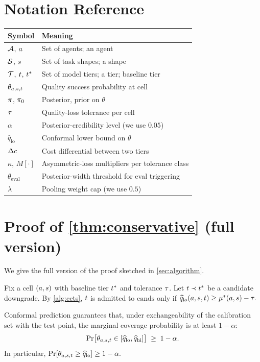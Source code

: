 \section{Notation Reference}
\label{app:notation}

\begin{center}
\begin{tabular}{ll}
\toprule
Symbol & Meaning \\
\midrule
$\mathcal{A}$, $a$ & Set of agents; an agent \\
$\mathcal{S}$, $s$ & Set of task shapes; a shape \\
$\mathcal{T}$, $t$, $t^*$ & Set of model tiers; a tier; baseline tier \\
$\theta_{a,s,t}$ & Quality success probability at cell \\
$\pi$, $\pi_0$ & Posterior, prior on $\theta$ \\
$\tau$ & Quality-loss tolerance per cell \\
$\alpha$ & Posterior-credibility level (we use $0.05$) \\
$\widehat{q}_{\mathrm{lo}}$ & Conformal lower bound on $\theta$ \\
$\Delta c$ & Cost differential between two tiers \\
$\kappa$, $M[\cdot]$ & Asymmetric-loss multipliers per tolerance class \\
$\theta_{\mathrm{eval}}$ & Posterior-width threshold for eval triggering \\
$\lambda$ & Pooling weight cap (we use $0.5$) \\
\bottomrule
\end{tabular}
\end{center}

\section{Proof of \cref{thm:conservative} (full version)}
\label{app:proof}

We give the full version of the proof sketched in \cref{sec:algorithm}.

Fix a cell $(a, s)$ with baseline tier $t^*$ and tolerance
$\tau$. Let $t \prec t^*$ be a candidate downgrade. By
\cref{alg:ccts}, $t$ is admitted to $\mathrm{cands}$ only if
\(
  \widehat{q}_{\mathrm{lo}}(a, s, t) \geq \mu^*(a, s) - \tau.
\)

Conformal prediction \cite{vovk2005algorithmic,angelopoulos2021gentle}
guarantees that, under exchangeability of the calibration set with the
test point, the marginal coverage probability is at least $1 - \alpha$:
\[
  \Pr\!\big[
    \theta_{a,s,t}
      \in [\widehat{q}_{\mathrm{lo}}, \widehat{q}_{\mathrm{hi}}]
  \big]
  \;\geq\; 1 - \alpha.
\]
In particular,
\(
  \Pr[\theta_{a,s,t} \geq \widehat{q}_{\mathrm{lo}}]
    \geq 1 - \alpha.
\)

